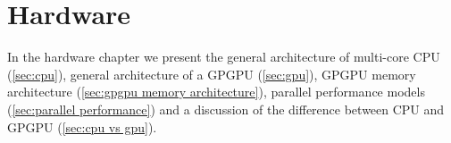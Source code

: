 \chapter{Hardware}
\label{chap:hardware}

In the hardware chapter we present the general architecture of multi-core CPU (\cref{sec:cpu}), general architecture of a GPGPU (\cref{sec:gpu}), GPGPU memory architecture (\cref{sec:gpgpu memory architecture}), parallel performance models (\cref{sec:parallel performance}) and a discussion of the difference between CPU and GPGPU (\cref{sec:cpu vs gpu}).






